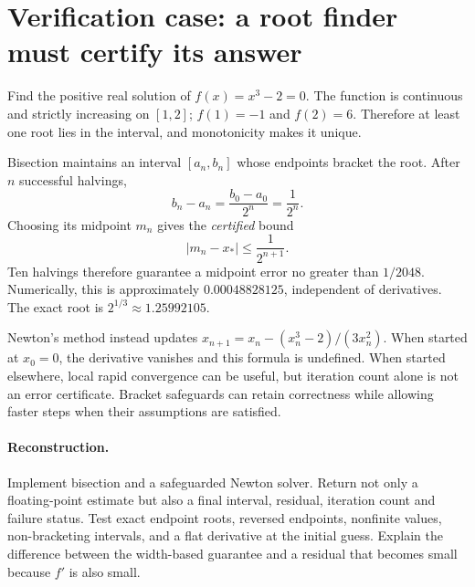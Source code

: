 \clearpage
\section*{Verification case: a root finder must certify its answer}
\noindent Find the positive real solution of \(f(x)=x^3-2=0\).
The function is continuous and strictly increasing on \([1,2]\);
\(f(1)=-1\) and \(f(2)=6\). Therefore at least one root lies in
the interval, and monotonicity makes it unique.

Bisection maintains an interval \([a_n,b_n]\) whose endpoints
bracket the root. After \(n\) successful halvings,
\[
b_n-a_n=\frac{b_0-a_0}{2^n}=\frac1{2^n}.
\]
Choosing its midpoint \(m_n\) gives the \emph{certified} bound
\[
|m_n-x_*|\le\frac1{2^{n+1}}.
\]
Ten halvings therefore guarantee a midpoint error no greater
than \(1/2048\). Numerically, this is approximately
\(0.00048828125\), independent of derivatives.
The exact root is \(2^{1/3}\approx1.25992105\).

Newton's method instead updates
\(x_{n+1}=x_n-(x_n^3-2)/(3x_n^2)\).
When started at \(x_0=0\), the derivative vanishes and this
formula is undefined. When started elsewhere, local rapid
convergence can be useful, but iteration count alone is not an
error certificate. Bracket safeguards can retain correctness while
allowing faster steps when their assumptions are satisfied.

\paragraph{Reconstruction.}
Implement bisection and a safeguarded Newton solver.
Return not only a floating-point estimate but also a final interval,
residual, iteration count and failure status.
Test exact endpoint roots, reversed endpoints, nonfinite values,
non-bracketing intervals, and a flat derivative at the initial guess.
Explain the difference between the width-based guarantee and a
residual that becomes small because \(f'\) is also small.
